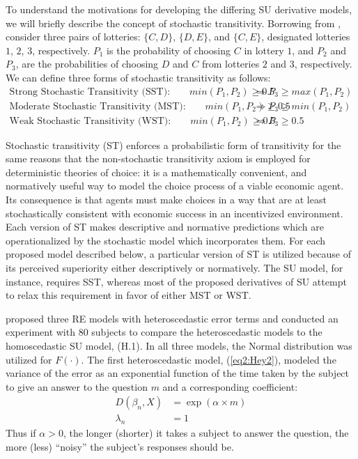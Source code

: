 \documentclass[../main.tex]{subfiles}
\begin{document}
To understand the motivations for developing the differing SU derivative models, we will briefly describe the concept of stochastic transitivity.
Borrowing from \textcite[210]{Wilcox2008}, consider three pairs of lotteries: $\{C,D\}$, $\{D,E\}$, and $\{C,E\}$, designated lotteries $1$, $2$, $3$, respectively.
$P_1$ is the probability of choosing $C$ in lottery $1$, and $P_2$ and $P_3$, are the probabilities of choosing $D$ and $C$ from lotteries $2$ and $3$, respectively.
We can define three forms of stochastic transitivity as follows:
\begin{align*}
	\text{Strong Stochastic Transitivity (SST):} \qquad \mathit{min}(P_1,P_2) \geq 0.5 &\Rightarrow P_3 \geq \mathit{max}(P_1,P_2) \\
	\text{Moderate Stochastic Transitivity (MST):} \qquad \mathit{min}(P_1,P_2) \geq 0.5 &\Rightarrow P_3 \geq \mathit{min}(P_1,P_2)\\
	\text{Weak Stochastic Transitivity (WST):} \qquad \mathit{min}(P_1,P_2) \geq 0.5 &\Rightarrow P_3 \geq 0.5
\end{align*}

Stochastic transitivity (ST) enforces a probabilistic form of transitivity for the same reasons that the non-stochastic transitivity axiom is employed for deterministic theories of choice: it is a mathematically convenient, and normatively useful way to model the choice process of a viable economic agent.
Its consequence is that agents must make choices in a way that are at least stochastically consistent with economic success in an incentivized environment.
Each version of ST makes descriptive and normative predictions which are operationalized by the stochastic model which incorporates them.
For each proposed model described below, a particular version of ST is utilized because of its perceived superiority either descriptively or normatively.
The SU model, for instance, requires SST, whereas most of the proposed derivatives of SU attempt to relax this requirement in favor of either MST or WST.

\textcite{Hey1995a} proposed three RE models with heteroscedastic error terms and conducted an experiment with 80 subjects to compare the heteroscedastic models to the homoscedastic SU model, (H.1).
In all three models, the Normal distribution was utilized for $F(\cdot)$.
The first heteroscedastic model, (\ref{eq2:Hey2}), modeled the variance of the error as an exponential function of the time taken by the subject to give an answer to the question $m$ and a corresponding coefficient:
\begin{align*}
	\tag{H.2}
	\label{eq2:Hey2}
	D(\beta_n,X) &= \exp(\alpha \times m)\\
	\lambda_n &= 1
\end{align*}
Thus if $\alpha > 0$, the longer (shorter) it takes a subject to answer the question, the more (less) \enquote{noisy} the subject's responses should be.
\end{document}
